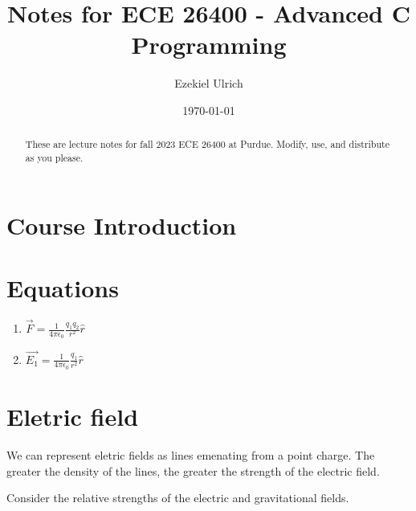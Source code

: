 \documentclass[nobib]{tufte-handout}
\title{Notes for ECE 26400 - Advanced C Programming}
\author[Ezekiel Ulrich]{Ezekiel Ulrich}
\date{\today}  %
\begin{document}
\maketitle

\begin{abstract}
These are lecture notes for fall 2023 ECE 26400 at Purdue. Modify, use, and distribute as you please.
\end{abstract}

\tableofcontents

\section{Course Introduction}

\section{Equations}

\begin{enumerate}
    \item $\vec{F} = \frac{1}{4\pi \epsilon_0}\frac{q_1 q_2}{r^2}\hat{r}$
    \item $\vec{E_1} = \frac{1}{4\pi \epsilon_0}\frac{q_1}{r^2}\hat{r}$

\end{enumerate}

\section{Eletric field}

We can represent eletric fields as lines emenating from a point charge. The greater the density of the lines, the greater 
the strength of the electric field. 

Consider the relative strengths of the electric and 
gravitational fields. 
\end{document}
